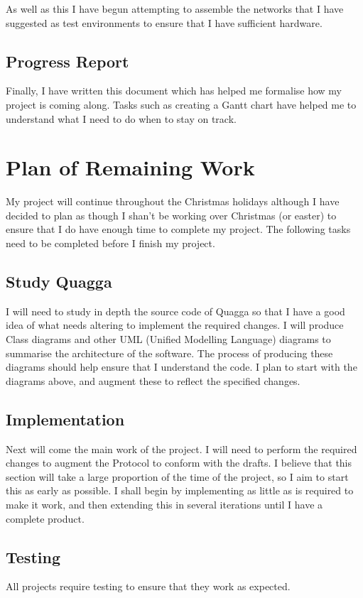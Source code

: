 \documentclass[12pt]{report}
\begin{document}
As well as this I have begun attempting to assemble the networks that I have
suggested as test environments to ensure that I have sufficient hardware. 

\section{Progress Report}
Finally, I have written this document which has helped me formalise how my
project is coming along. Tasks such as creating a Gantt chart have helped me to
understand what I need to do when to stay on track.

\chapter{Plan of Remaining Work}
My project will continue throughout the Christmas holidays although I have
decided to plan as though I shan't be working over Christmas (or easter) to
ensure that I do have enough time to complete my project. The following tasks
need to be completed before I finish my project.

\section{Study Quagga}
I will need to study in depth the source code of Quagga so that I have a
good idea of what needs altering to implement the required changes. I will
produce Class diagrams and other UML (Unified Modelling Language) diagrams to 
summarise the architecture of the software. The process of producing these
diagrams should help ensure that I understand the code. I plan to start with the
diagrams above, and augment these to reflect the specified changes. 

\section{Implementation}
Next will come the main work of the project. I will need to perform the required
changes to augment the Protocol to conform with the drafts. I believe that this
section will take a large proportion of the time of the project, so I aim to
start this as early as possible. I shall begin by implementing as little as
is required to make it work, and then extending this in several iterations until
I have a complete product.

\section{Testing}
All projects require testing to ensure that they work as expected.
\end{document}
